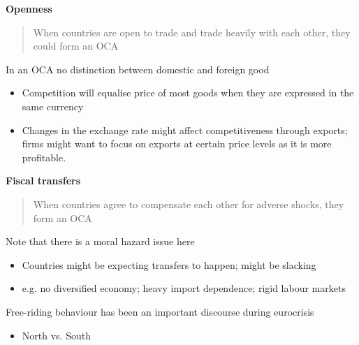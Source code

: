\documentclass{beamer}
\begin{document}
\begin{frame}
  \textbf{Openness} 
  \begin{quote}
    When countries are open to trade and trade heavily with each other, they could form an OCA
  \end{quote}
  \medskip
  In an OCA no distinction between domestic and foreign good
  \begin{itemize}
    \item Competition will equalise price of most goods when they are expressed in the same currency
    \item Changes in the exchange rate might affect competitiveness through exports; firms might want to focus on exports at certain price levels as it is more profitable.
  \end{itemize}
\end{frame}

\begin{frame}
 
\end{frame}


\begin{frame}
  \textbf{Fiscal transfers} 
  \begin{quote}
    When countries agree to compensate each other for adverse shocks, they form an OCA
  \end{quote}
  \medskip
  Note that there is a moral hazard issue here
  \begin{itemize}
    \item Countries might be expecting transfers to happen; might be slacking
    \item e.g. no diversified economy; heavy import dependence; rigid labour markets
  \end{itemize}
  \medskip
  Free-riding behaviour has been an important discourse during eurocrisis
  \begin{itemize}
    \item North vs. South
  \end{itemize}
\end{frame}
\end{document}
